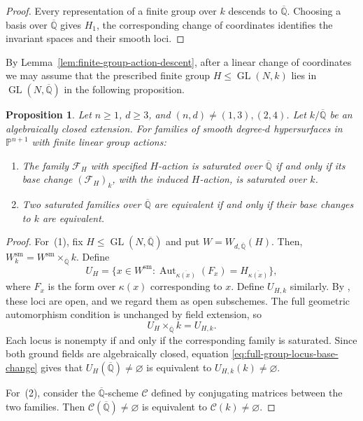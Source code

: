 \documentclass[12pt]{amsart}
\numberwithin{equation}{section}
\theoremstyle{plain}
\newtheorem{prop}[thm]{Proposition}
\theoremstyle{definition}
\theoremstyle{remark}
\newcommand{\PP}{\mathbb P}
\DeclareMathOperator{\Aut}{Aut}
\DeclareMathOperator{\GL}{GL}
\begin{document}
\begin{proof}
Every representation of a finite group over \(k\) descends to
\(\overline{\mathbb Q}\). Choosing a basis over
\(\overline{\mathbb Q}\) gives \(H_1\), the corresponding change
of coordinates identifies the invariant spaces and their smooth loci.
\end{proof}

By Lemma~\ref{lem:finite-group-action-descent}, after a linear
change of coordinates we may assume that the prescribed finite
group \(H\leq\GL(N,k)\) lies in
\(\GL(N,\overline{\mathbb Q})\) in the following proposition.

\begin{prop}\label{prop:classification-base-change}
Let \(n\geq1\), \(d\geq3\), and \((n,d)\neq(1,3),(2,4)\).
Let \(k/\overline{\mathbb Q}\) be an algebraically closed extension.
For families of smooth degree-\(d\) hypersurfaces in \(\PP^{n+1}\)
with finite linear group actions:
\begin{enumerate}
\item The family \(\mathcal F_H\) with specified \(H\)-action is saturated over \(\overline{\mathbb Q}\) if and only if
its base change \((\mathcal F_H)_k\), with the induced \(H\)-action, is saturated over \(k\).
\item Two saturated families over \(\overline{\mathbb Q}\) are
 equivalent if and only if their base changes to \(k\) are equivalent.
\end{enumerate}
\end{prop}

\begin{proof}
For~(1), fix \(H\leq\GL(N,\overline{\mathbb Q})\) and put
\(W=W_{d,\overline{\mathbb Q}}(H)\). Then, \(W_k^{\mathrm{sm}}=W^{\mathrm{sm}}\times_{\overline{\mathbb Q}}k\).
Define
\[
 U_H=\{x\in W^{\mathrm{sm}}:
 \Aut_{\overline{\kappa(x)}}(F_x)=H_{\overline{\kappa(x)}}\},
\]
where \(F_x\) is the form over \(\kappa(x)\) corresponding to \(x\).
Define \(U_{H,k}\) similarly. By \cite[Part~II, Theorem~6.3]{MR1309681}, these loci are open, and we
regard them as open subschemes. The full geometric automorphism
condition is unchanged by field extension, so
\begin{equation}\label{eq:full-group-locus-base-change}
 U_H\times_{\overline{\mathbb Q}}k=U_{H,k}.
\end{equation}
Each locus is nonempty if and only if the corresponding family
is saturated. Since both ground fields
are algebraically closed, equation \eqref{eq:full-group-locus-base-change} gives that 
$U_H(\overline{\mathbb Q})\neq\varnothing$ is equivalent to $U_{H,k}(k)\neq\varnothing$.

For~(2), consider the $\overline{\mathbb{Q}}$-scheme $\mathcal{C}$ defined by conjugating matrices between the two families. Then $\mathcal{C}(\overline{\mathbb{Q}})\neq \varnothing$ is equivalent to $\mathcal{C}(k)\neq \varnothing$.
\end{proof}
\end{document}
